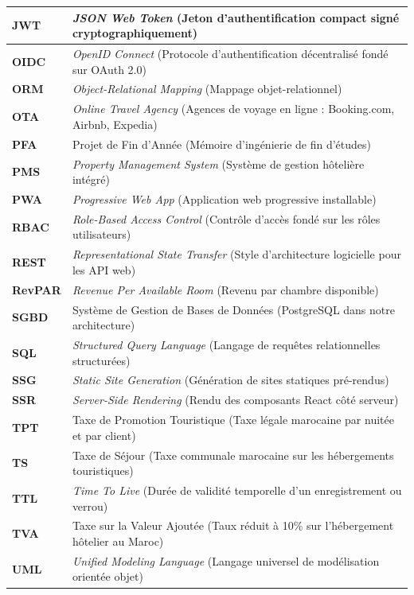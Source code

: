 \documentclass[12pt,a4paper,oneside]{report}
\begin{document}
\begin{table}[H]
\begin{tabularx}{\textwidth}{|p{3.5cm}|X|}
\hline
\textbf{JWT} & \textit{JSON Web Token} (Jeton d'authentification compact signé cryptographiquement) \\
\hline
\textbf{OIDC} & \textit{OpenID Connect} (Protocole d'authentification décentralisé fondé sur OAuth 2.0) \\
\hline
\textbf{ORM} & \textit{Object-Relational Mapping} (Mappage objet-relationnel) \\
\hline
\textbf{OTA} & \textit{Online Travel Agency} (Agences de voyage en ligne : Booking.com, Airbnb, Expedia) \\
\hline
\textbf{PFA} & Projet de Fin d'Année (Mémoire d'ingénierie de fin d'études) \\
\hline
\textbf{PMS} & \textit{Property Management System} (Système de gestion hôtelière intégré) \\
\hline
\textbf{PWA} & \textit{Progressive Web App} (Application web progressive installable) \\
\hline
\textbf{RBAC} & \textit{Role-Based Access Control} (Contrôle d'accès fondé sur les rôles utilisateurs) \\
\hline
\textbf{REST} & \textit{Representational State Transfer} (Style d'architecture logicielle pour les API web) \\
\hline
\textbf{RevPAR} & \textit{Revenue Per Available Room} (Revenu par chambre disponible) \\
\hline
\textbf{SGBD} & Système de Gestion de Bases de Données (PostgreSQL dans notre architecture) \\
\hline
\textbf{SQL} & \textit{Structured Query Language} (Langage de requêtes relationnelles structurées) \\
\hline
\textbf{SSG} & \textit{Static Site Generation} (Génération de sites statiques pré-rendus) \\
\hline
\textbf{SSR} & \textit{Server-Side Rendering} (Rendu des composants React côté serveur) \\
\hline
\textbf{TPT} & Taxe de Promotion Touristique (Taxe légale marocaine par nuitée et par client) \\
\hline
\textbf{TS} & Taxe de Séjour (Taxe communale marocaine sur les hébergements touristiques) \\
\hline
\textbf{TTL} & \textit{Time To Live} (Durée de validité temporelle d'un enregistrement ou verrou) \\
\hline
\textbf{TVA} & Taxe sur la Valeur Ajoutée (Taux réduit à 10\% sur l'hébergement hôtelier au Maroc) \\
\hline
\textbf{UML} & \textit{Unified Modeling Language} (Langage universel de modélisation orientée objet) \\

\end{tabularx}
\end{table}
\end{document}
